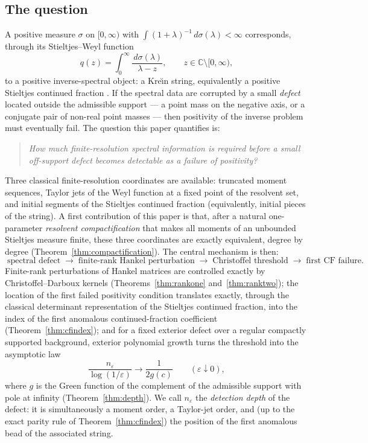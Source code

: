 \documentclass[11pt]{amsart}
\theoremstyle{definition}
\theoremstyle{remark}
\newcommand{\C}{\mathbb{C}}
\newcommand{\dd}{\,d}
\newcommand{\eps}{\varepsilon}
\begin{document}
\subsection{The question}
A positive measure $\sigma$ on $[0,\infty)$ with
$\int (1+\lambda)^{-1}\dd\sigma(\lambda)<\infty$ corresponds, through its
Stieltjes--Weyl function
\[
q(z)=\int_0^\infty\frac{\dd\sigma(\lambda)}{\lambda-z},
\qquad z\in\C\setminus[0,\infty),
\]
to a positive inverse-spectral object: a Kre\u{\i}n string, equivalently a
positive Stieltjes continued fraction \cite{Stieltjes,KacKrein,Wall,GK}.
If the spectral data are corrupted by a small \emph{defect} located outside
the admissible support --- a point mass on the negative axis, or a conjugate
pair of non-real point masses --- then positivity of the inverse problem must
eventually fail. The question this paper quantifies is:
\begin{quote}
\emph{How much finite-resolution spectral information is required before a
small off-support defect becomes detectable as a failure of positivity?}
\end{quote}
Three classical finite-resolution coordinates are available: truncated moment
sequences, Taylor jets of the Weyl function at a fixed point of the resolvent
set, and initial segments of the Stieltjes continued fraction (equivalently,
initial pieces of the string). A first contribution of this paper is that,
after a natural one-parameter \emph{resolvent compactification} that makes all
moments of an unbounded Stieltjes measure finite, these three coordinates are
exactly equivalent, degree by degree
(Theorem~\ref{thm:compactification}). The central mechanism is then:
\[
\boxed{\;
\text{spectral defect}
\;\longrightarrow\;
\text{finite-rank Hankel perturbation}
\;\longrightarrow\;
\text{Christoffel threshold}
\;\longrightarrow\;
\text{first CF failure}.\;}
\]
Finite-rank perturbations of Hankel matrices are controlled exactly by
Christoffel--Darboux kernels (Theorems~\ref{thm:rankone}
and~\ref{thm:ranktwo}); the location of the first failed positivity condition
translates exactly, through the classical determinant representation of the
Stieltjes continued fraction, into the index of the first anomalous
continued-fraction coefficient (Theorem~\ref{thm:cfindex}); and for a fixed
exterior defect over a regular compactly supported background, exterior
polynomial growth turns the threshold into the asymptotic law
\begin{equation}\label{eq:introdepth}
\frac{n_\eps}{\log(1/\eps)}\longrightarrow\frac1{2g(c)}
\qquad(\eps\downarrow0),
\end{equation}
where $g$ is the Green function of the complement of the admissible support
with pole at infinity (Theorem~\ref{thm:depth}). We call $n_\eps$ the
\emph{detection depth} of the defect: it is simultaneously a moment order, a
Taylor-jet order, and (up to the exact parity rule of
Theorem~\ref{thm:cfindex}) the position of the first anomalous bead of the
associated string.
\end{document}
